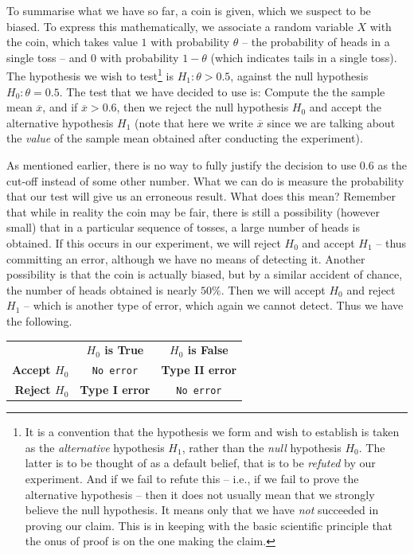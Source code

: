 \documentclass[svgnames, a5paper]{article}
\theoremstyle{definition}
\theoremstyle{remark}
\begin{document}
To summarise what we have so far, a coin is given, which we suspect to be biased. To express this mathematically, we associate a random variable $X$ with the coin, which takes value $1$ with probability $\theta$ -- the probability of heads in a single toss -- and $0$ with probability $1 - \theta$ (which indicates tails in a single toss). The hypothesis we wish to test\footnote{
	It is a convention that the hypothesis we form and wish to establish is taken as the \emph{alternative} hypothesis $H_1$, rather than the \emph{null} hypothesis $H_0$. The latter is to be thought of as a default belief, that is to be \emph{refuted} by our experiment. And if we fail to refute this -- i.e., if we fail to prove the alternative hypothesis -- then it does not usually mean that we strongly believe the null hypothesis. It means only that we have \emph{not} succeeded in proving our claim. This is in keeping with the basic scientific principle that the onus of proof is on the one making the claim.
} is $H_1 \colon \theta > 0.5$, against the null hypothesis $H_0 \colon \theta = 0.5$. The test that we have decided to use is: Compute the the sample mean $\overline x$, and if $\overline x > 0.6$, then we reject the null hypothesis $H_0$ and accept the alternative hypothesis $H_1$ (note that here we write $\overline x$ since we are talking about the \emph{value} of the sample mean obtained after conducting the experiment).

As mentioned earlier, there is no way to fully justify the decision to use $0.6$ as the cut-off instead of some other number. What we can do is measure the probability that our test will give us an erroneous result. What does this mean? Remember that while in reality the coin may be fair, there is still a possibility (however small) that in a particular sequence of tosses, a large number of heads is obtained. If this occurs in our experiment, we will reject $H_0$ and accept $H_1$ -- thus committing an error, although we have no means of detecting it. Another possibility is that the coin is actually biased, but by a similar accident of chance, the number of heads obtained is nearly $50\%$. Then we will accept $H_0$ and reject $H_1$ -- which is another type of error, which again we cannot detect. Thus we have the following.
\begin{center}
\begin{tabular}{|r||c|c|}
\hline
				& \textbf{$H_0$ is True}	& \textbf{$H_0$ is False}\\
\hhline{|===|}
\textbf{Accept $H_0$}	& \small{\texttt{No error}}		& \small\textbf{\color{red} Type II error}\\
\hline
\textbf{Reject $H_0$}	& \small\textbf{\color{red} Type I error}	&	\small{\texttt{No error}}\\
\hline
\end{tabular}
\end{center}
\end{document}

